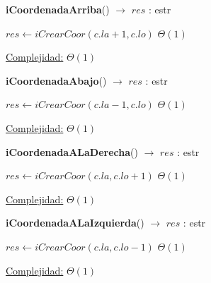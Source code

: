 \begin{Algoritmos}
\begin{algorithm}[H]{\textbf{iCoordenadaArriba}() $\to$ $res$ : estr}
    	\begin{algorithmic}[1]
			\State $res \gets iCrearCoor(c.la + 1, c.lo)$ \Comment $\Theta(1)$
			
			\medskip
			\Statex \underline{Complejidad:} $\Theta(1)$
    	\end{algorithmic}
\end{algorithm}

\begin{algorithm}[H]{\textbf{iCoordenadaAbajo}() $\to$ $res$ : estr}
    	\begin{algorithmic}[1]
			\State $res \gets iCrearCoor(c.la - 1, c.lo)$ \Comment $\Theta(1)$
			
			\medskip
			\Statex \underline{Complejidad:} $\Theta(1)$
    	\end{algorithmic}
\end{algorithm}

\begin{algorithm}[H]{\textbf{iCoordenadaALaDerecha}() $\to$ $res$ : estr}
    	\begin{algorithmic}[1]
			\State $res \gets iCrearCoor(c.la, c.lo + 1)$ \Comment $\Theta(1)$
			
			\medskip
			\Statex \underline{Complejidad:} $\Theta(1)$
    	\end{algorithmic}
\end{algorithm}

\begin{algorithm}[H]{\textbf{iCoordenadaALaIzquierda}() $\to$ $res$ : estr}
    	\begin{algorithmic}[1]
			\State $res \gets iCrearCoor(c.la, c.lo - 1)$ \Comment $\Theta(1)$
			
			\medskip
			\Statex \underline{Complejidad:} $\Theta(1)$
    	\end{algorithmic}
\end{algorithm}

\end{Algoritmos}
